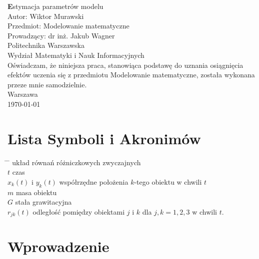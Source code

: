 \documentclass[a4paper, 12pt, twoside, openany]{article}
\date{\today}
\newcommand{\tytul}{Estymacja parametrów modelu}
\newcommand{\autor}{Wiktor Murawski}
\newcommand{\uczelnia}{Politechnika Warszawska}
\newcommand{\wydzial}{Wydział Matematyki i Nauk Informacyjnych}
\newcommand{\prowadzacy}{dr inż. Jakub Wagner}
\newcommand{\przedmiot}{Modelowanie matematyczne}
\newcommand{\miejsce}{Warszawa}
\begin{document}
	
	\begin{titlepage}
		\centering
		\vspace*{1cm}
		\LARGE\textbf \tytul \\
		\vspace{1.5cm}
		\large
		Autor: \autor \\
		\vspace{1cm}
		Przedmiot: \przedmiot \\
		Prowadzący: \prowadzacy \\
		\vspace{2cm}
		\uczelnia \\
		\wydzial \\
		\vspace{2cm}
		Oświadczam, że niniejsza praca, stanowiąca podstawę do uznania osiągnięcia efektów
		uczenia się z przedmiotu Modelowanie matematyczne, została wykonana przeze mnie samodzielnie.\\
		\vspace{2cm}
		\miejsce \\
		\today \\
	\end{titlepage}
	
	\tableofcontents
	\newpage
	
	\section{Lista Symboli i Akronimów}
	\begin{spacing}{1.5}
		\begin{tabbing}
			\hspace{5cm} \= \hspace{10cm} \= \kill
			 \> układ równań różniczkowych zwyczajnych \\
			$t$ \> czas \\
			$x_k(t)$ i $y_k(t)$ \> współrzędne położenia $k$-tego obiektu w chwili $t$\\
			$m$ \> masa obiektu \\
			$G$ \> stała grawitacyjna \\
			$r_{jk}(t)$ \> odległość pomiędzy obiektami $j$ i $k$ dla $j,k = 1,2,3$ w chwili $t$.
		\end{tabbing}
	\end{spacing}
	\newpage
	
	\section{Wprowadzenie}
	
\end{document}
